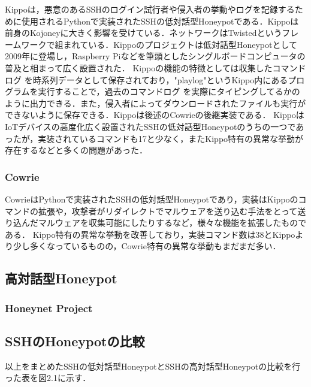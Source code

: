 Kippoは，悪意のあるSSHのログイン試行者や侵入者の挙動やログを記録するために使用されるPythonで実装されたSSHの低対話型Honeypotである\cite{kippo}．Kippoは前身のKojoney\cite{kojoney}に大きく影響を受けている．ネットワークはTwisted\cite{twisted}というフレームワークで組まれている．Kippoのプロジェクトは低対話型Honeypotとして2009年に登場し，Raspberry Pi\cite{rasp}などを筆頭としたシングルボードコンピュータ\cite{singleboard}の普及と相まって広く設置された．
Kippoの機能の特徴としては収集したコマンドログ を時系列データとして保存されており，"playlog"というKippo内にあるプログラムを実行することで，過去のコマンドログ を実際にタイピングしてるかのように出力できる．また，侵入者によってダウンロードされたファイルも実行ができないように保存できる．Kippoは後述のCowrieの後継実装である．\cite{kippowiki}
KippoはIoTデバイスの高度化広く設置されたSSHの低対話型Honeypotのうちの一つであったが，実装されているコマンドも17\cite{kippocommand}と少なく，またKippo特有の異常な挙動が存在するなどと多くの問題があった．

\subsubsection{Cowrie}
\label{tech:Cowrie}
CowrieはPythonで実装されたSSHの低対話型Honeypotであり，実装はKippoのコマンドの拡張や，攻撃者がリダイレクトでマルウェアを送り込む手法をとって送り込んだマルウェアを収集可能にしたりするなど，様々な機能を拡張したものである．
Kippo特有の異常な挙動を改善しており，実装コマンド数は38\cite{cowriecommand}とKippoより少し多くなっているものの\cite{differfromkippo}，Cowrie特有の異常な挙動もまだまだ多い．



\subsection{高対話型Honeypot}
\label{tech:HighInteractionHoneypot}

\subsubsection{Honeynet Project}
\label{tech:Honeynet}

\subsection{SSHのHoneypotの比較}
\label{tech:CompareHoneypot}
以上をまとめたSSHの低対話型HoneypotとSSHの高対話型Honeypotの比較を行った表を図2.1に示す．

